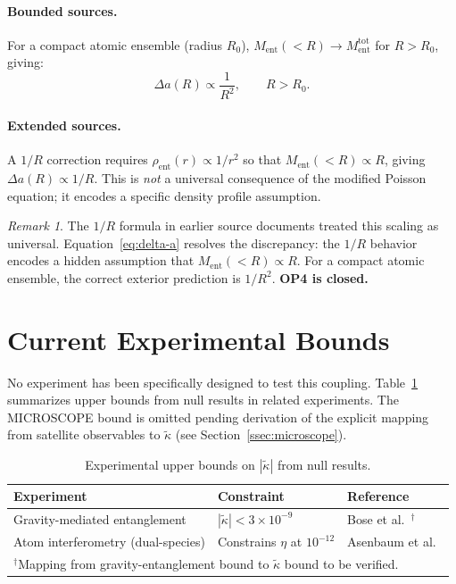 \documentclass[12pt,letterpaper]{article}
\theoremstyle{plain}
\theoremstyle{definition}
\theoremstyle{remark}
\newtheorem{remark}[theorem]{Remark}
\newcommand{\kt}{\tilde{\kappa}}
\newcommand{\Ment}{M_{\mathrm{ent}}}
\newcommand{\Deltaa}{\Delta a}
\begin{document}
\paragraph{Bounded sources.}
For a compact atomic ensemble (radius $R_{0}$), $\Ment(<R) \to \Ment^{\mathrm{tot}}$ for
$R > R_{0}$, giving:
\begin{equation}
  \Deltaa(R) \propto \frac{1}{R^{2}}, \qquad R > R_{0}.
  \label{eq:1/R2}
\end{equation}

\paragraph{Extended sources.}
A $1/R$ correction requires $\rho_{\mathrm{ent}}(r) \propto 1/r^{2}$ so that
$\Ment(<R) \propto R$, giving $\Deltaa(R) \propto 1/R$.  This is \emph{not} a universal
consequence of the modified Poisson equation; it encodes a specific density profile assumption.

\begin{remark}
The $1/R$ formula in earlier source documents treated this scaling as universal.
Equation~\eqref{eq:delta-a} resolves the discrepancy: the $1/R$ behavior encodes a hidden
assumption that $\Ment(<R) \propto R$.  For a compact atomic ensemble, the correct exterior
prediction is $1/R^{2}$.  \textbf{OP4 is closed.}
\end{remark}

\section{Current Experimental Bounds}
\label{sec:bounds}

No experiment has been specifically designed to test this coupling.  Table~\ref{tab:bounds}
summarizes upper bounds from null results in related experiments.  The MICROSCOPE bound is
omitted pending derivation of the explicit mapping from satellite observables to $\kt$
(see Section~\ref{ssec:microscope}).

\begin{table}[h]
\centering
\caption{Experimental upper bounds on $|\kt|$ from null results.}
\label{tab:bounds}
\begin{tabular}{@{}lll@{}}
\toprule
Experiment & Constraint & Reference \\
\midrule
Gravity-mediated entanglement & $|\kt| < 3\times10^{-9}$ & Bose et al.~\cite{Bose2017}$^{\dagger}$ \\
Atom interferometry (dual-species) & Constrains $\eta$ at $10^{-12}$ & Asenbaum et al.~\cite{Asenbaum2020} \\
\bottomrule
\multicolumn{3}{l}{$^{\dagger}$\footnotesize Mapping from gravity-entanglement bound to $\kt$ bound to be verified.} \\
\end{tabular}
\end{table}
\end{document}
